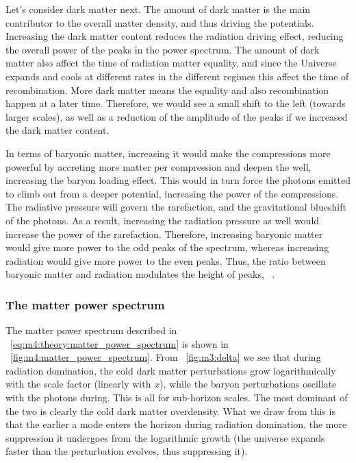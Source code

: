         Let's consider dark matter next. The amount of dark matter is the main contributor to the overall matter density, and thus driving the potentials. Increasing the dark matter content reduces the radiation driving effect, reducing the overall power of the peaks in the power spectrum. The amount of dark matter also affect the time of radiation matter equality, and since the Universe expands and cools at different rates in the different regimes this affect the time of recombination. More dark matter means the equality and also recombination happen at a later time. Therefore, we would see a small shift to the left (towards larger scales), as well as a reduction of the amplitude of the peaks if we increased the dark matter content.   

        In terms of baryonic matter, increasing it would make the compressions more powerful by accreting more matter per compression and deepen the well, increasing the baryon loading effect. This would in turn force the photons emitted to climb out from a deeper potential, increasing the power of the compressions. The radiative pressure will govern the rarefaction, and the gravitational blueshift of the photons. As a result, increasing the radiation pressure as well would increase the power of the rarefaction. Therefore, increasing baryonic matter would give more power to the odd peaks of the spectrum, whereas increasing radiation would give more power to the even peaks. Thus, the ratio between baryonic matter and radiation modulates the height of peaks, ~\cite{Hu_1996}.

    \subsubsection{The matter power spectrum}
        The matter power spectrum described in ~\cref{eq:m4:theory:matter_power_spectrum} is shown in ~\cref{fig:m4:matter_power_spectrum}. From ~\cref{fig:m3:delta} we see that during radiation domination, the cold dark matter perturbations grow logarithmically with the scale factor (linearly with $x$), while the baryon perturbations oscillate with the photons during. This is all for sub-horizon scales. The most dominant of the two is clearly the cold dark matter overdensity. What we draw from this is that the earlier a mode enters the horizon during radiation domination, the more suppression it undergoes from the logarithmic growth (the universe expands faster than the perturbation evolves, thus suppressing it). 

